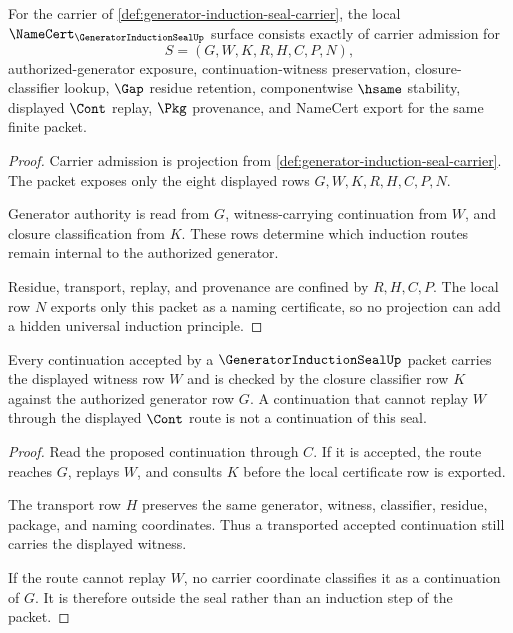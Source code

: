 \begin{theorem}
\label{thm:generator-induction-seal-namecert-obligations}
For the carrier of \autoref{def:generator-induction-seal-carrier}, the local $\NameCert_{\GeneratorInductionSealUp}$ surface consists exactly of carrier admission for
$$
S=(G,W,K,R,H,C,P,N),
$$
authorized-generator exposure, continuation-witness preservation, closure-classifier lookup, $\Gap$ residue retention, componentwise $\hsame$ stability, displayed $\Cont$ replay, $\Pkg$ provenance, and NameCert export for the same finite packet.
\end{theorem}
\begin{proof}
Carrier admission is projection from \autoref{def:generator-induction-seal-carrier}. The packet exposes only the eight displayed rows $G,W,K,R,H,C,P,N$.

Generator authority is read from $G$, witness-carrying continuation from $W$, and closure classification from $K$. These rows determine which induction routes remain internal to the authorized generator.

Residue, transport, replay, and provenance are confined by $R,H,C,P$. The local row $N$ exports only this packet as a naming certificate, so no projection can add a hidden universal induction principle.
\end{proof}

\begin{theorem}
\label{thm:generator-induction-seal-continuation-witness}
Every continuation accepted by a $\GeneratorInductionSealUp$ packet carries the displayed witness row $W$ and is checked by the closure classifier row $K$ against the authorized generator row $G$. A continuation that cannot replay $W$ through the displayed $\Cont$ route is not a continuation of this seal.
\end{theorem}
\begin{proof}
Read the proposed continuation through $C$. If it is accepted, the route reaches $G$, replays $W$, and consults $K$ before the local certificate row is exported.

The transport row $H$ preserves the same generator, witness, classifier, residue, package, and naming coordinates. Thus a transported accepted continuation still carries the displayed witness.

If the route cannot replay $W$, no carrier coordinate classifies it as a continuation of $G$. It is therefore outside the seal rather than an induction step of the packet.
\end{proof}

